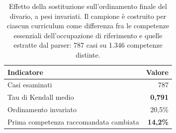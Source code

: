 \begin{table}[htbp]
  \centering
  \caption{Effetto della sostituzione sull'ordinamento finale del divario, a
           pesi invariati. Il campione è costruito per ciascun curriculum come
           differenza fra le competenze essenziali dell'occupazione di
           riferimento e quelle estratte dal parser: 787 casi su 1.346
           competenze distinte.}
  \label{tab:skill-graph-effetto}
  \begin{tabular}{lr}
    \toprule
    \textbf{Indicatore} & \textbf{Valore} \\
    \midrule
    Casi esaminati                            & 787 \\
    Tau di Kendall medio                      & \textbf{0,791} \\
    Ordinamento invariato                     & 20,5\% \\
    Prima competenza raccomandata cambiata    & \textbf{14,2\%} \\
    \bottomrule
  \end{tabular}
\end{table}
